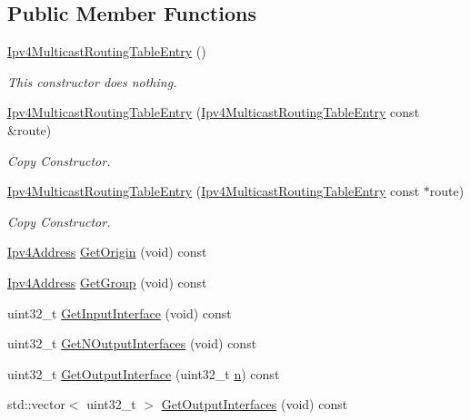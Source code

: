 \subsection*{Public Member Functions}
\begin{DoxyCompactItemize}
\item 
\hyperlink{classns3_1_1Ipv4MulticastRoutingTableEntry_ab482a0af24bcf91d15a1cc7a455297ed}{Ipv4\+Multicast\+Routing\+Table\+Entry} ()
\begin{DoxyCompactList}\small\item\em This constructor does nothing. \end{DoxyCompactList}\item 
\hyperlink{classns3_1_1Ipv4MulticastRoutingTableEntry_a16ace1697199007ca0d4dc3d641b4dbc}{Ipv4\+Multicast\+Routing\+Table\+Entry} (\hyperlink{classns3_1_1Ipv4MulticastRoutingTableEntry}{Ipv4\+Multicast\+Routing\+Table\+Entry} const \&route)
\begin{DoxyCompactList}\small\item\em Copy Constructor. \end{DoxyCompactList}\item 
\hyperlink{classns3_1_1Ipv4MulticastRoutingTableEntry_aa3f187e817c62a08dd1b0cb8325ecc1a}{Ipv4\+Multicast\+Routing\+Table\+Entry} (\hyperlink{classns3_1_1Ipv4MulticastRoutingTableEntry}{Ipv4\+Multicast\+Routing\+Table\+Entry} const $\ast$route)
\begin{DoxyCompactList}\small\item\em Copy Constructor. \end{DoxyCompactList}\item 
\hyperlink{classns3_1_1Ipv4Address}{Ipv4\+Address} \hyperlink{classns3_1_1Ipv4MulticastRoutingTableEntry_a3dd48341d47991f5ab7ada5323ebe363}{Get\+Origin} (void) const 
\item 
\hyperlink{classns3_1_1Ipv4Address}{Ipv4\+Address} \hyperlink{classns3_1_1Ipv4MulticastRoutingTableEntry_ac4ee8795f597a84a8c273840c0e3b7bc}{Get\+Group} (void) const 
\item 
uint32\+\_\+t \hyperlink{classns3_1_1Ipv4MulticastRoutingTableEntry_a43dbb54b66e279d5da7cd7144aaf2a8f}{Get\+Input\+Interface} (void) const 
\item 
uint32\+\_\+t \hyperlink{classns3_1_1Ipv4MulticastRoutingTableEntry_a02ede69355cf9443bfeb305568619cf6}{Get\+N\+Output\+Interfaces} (void) const 
\item 
uint32\+\_\+t \hyperlink{classns3_1_1Ipv4MulticastRoutingTableEntry_acd1feccb8fdecc671aceb9d6e221adf0}{Get\+Output\+Interface} (uint32\+\_\+t \hyperlink{lte__link__budget__x2__handover__measures_8m_abdb05bc5a064cf642a06c83b3392f148}{n}) const 
\item 
std\+::vector$<$ uint32\+\_\+t $>$ \hyperlink{classns3_1_1Ipv4MulticastRoutingTableEntry_a058d982b9a3ea8c9e62829798e2b9637}{Get\+Output\+Interfaces} (void) const 
\end{DoxyCompactItemize}
